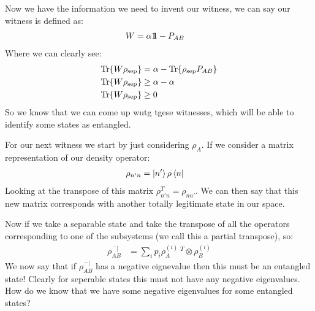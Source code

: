 Now we have the information we need to invent our witness, we can say our witness is defined as:
\begin{align*}
	W &= \alpha 1\!\!1 - P_{AB}
\end{align*}
Where we can clearly see:
\begin{align*}
	\Tr{W\rho_\text{sep}} &= \alpha - \Tr{\rho_\text{sep} P_{AB}} \\
	\Tr{W\rho_\text{sep}} &\geq \alpha - \alpha \\
	\Tr{W\rho_\text{sep}} &\geq 0
\end{align*}
So we know that we can come up wutg tgese witnesses, which will be able to identify some states as entangled.

For our next witness we start by just considering $\rho_A$. If we consider a matrix representation of our density operator:
\begin{align*}
	\rho_{n'n} &= \ket{n'}\rho\bra{n}
\end{align*}
Looking at the transpose of this matrix $\rho_{n' n}^T = \rho_{n n'}$. We can then say that this new matrix corresponds with another totally legitimate state in our space.

Now if we take a separable state and take the transpose of all the operators corresponding to one of the subsystems (we call this a partial transpose), so:
\begin{align*}
	\rho_{AB}^{\ ^-|} &= \sum_i p_i\rho_A^{(i)}\ ^T \otimes \rho_B^{(i)}
\end{align*}
We now say that if $\rho_{AB}^{\ ^-|}$ has a negative eignevalue then this must be an entangled state! Clearly for seperable states this must not have any negative eigenvalues.
How do we know that we have some negative eigenvalues for some entangled states?

